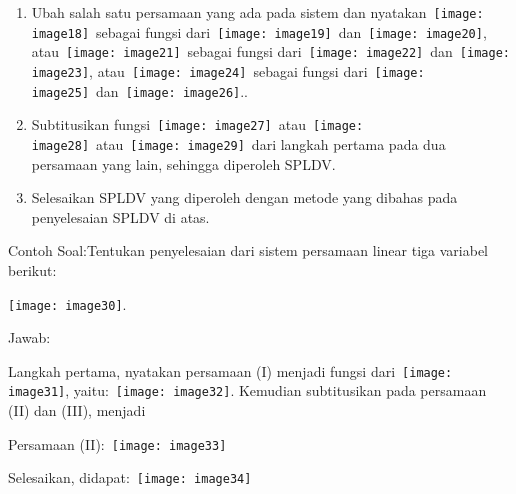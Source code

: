 \documentclass[11pt,fleqn]{book} %
\begin{document}
\begin{enumerate}
\item  Ubah salah satu persamaan yang ada pada sistem dan nyatakan~\texttt{[image: image18]}~sebagai fungsi dari~\texttt{[image: image19]}~dan~\texttt{[image: image20]}, atau~\texttt{[image: image21]}~sebagai fungsi dari~\texttt{[image: image22]}~dan~\texttt{[image: image23]}, atau~\texttt{[image: image24]}~sebagai fungsi dari~\texttt{[image: image25]}~dan~\texttt{[image: image26]}..

\item  Subtitusikan fungsi~\texttt{[image: image27]}~atau~\texttt{[image: image28]}~atau~\texttt{[image: image29]}~dari langkah pertama pada dua persamaan yang lain, sehingga diperoleh SPLDV.

\item  Selesaikan SPLDV yang diperoleh dengan metode yang dibahas pada penyelesaian SPLDV di atas.
\end{enumerate}

\noindent Contoh Soal:Tentukan penyelesaian dari sistem persamaan linear tiga variabel berikut:

\noindent \texttt{[image: image30]}.

\noindent Jawab:

\noindent Langkah pertama, nyatakan persamaan (I) menjadi fungsi dari~\texttt{[image: image31]}, yaitu:~\texttt{[image: image32]}. Kemudian subtitusikan pada persamaan (II) dan (III), menjadi

\noindent Persamaan (II):~\texttt{[image: image33]}

\noindent Selesaikan, didapat:~\texttt{[image: image34]}
\end{document}
